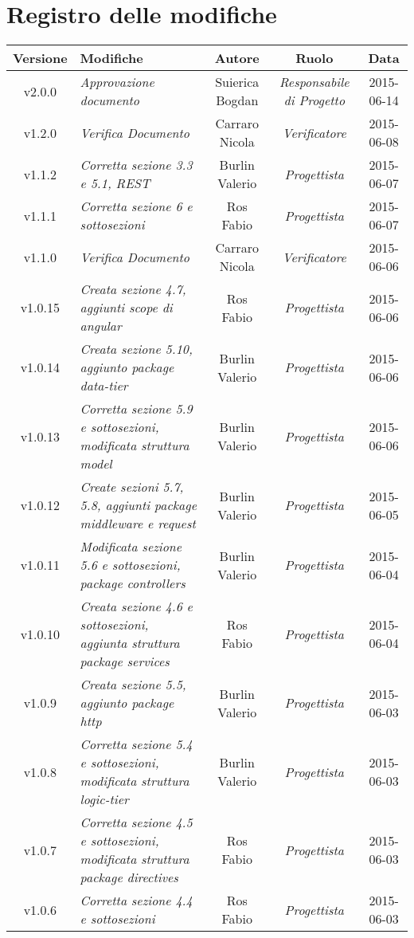 \section*{Registro delle modifiche}

\begin{table}[h]
\centering
\begin{tabular}{|c|p{}|c|c|c|}
	\toprule
	\textbf{Versione} & \textbf{Modifiche} & \textbf{Autore} & \textbf{Ruolo} & \textbf{Data} \\
	\midrule
		v2.0.0 & \textit{Approvazione documento} & Suierica Bogdan & \textit{Responsabile di Progetto} & 2015-06-14\\
	\midrule
		v1.2.0 & \textit{Verifica Documento} & Carraro Nicola & \textit{Verificatore} & 2015-06-08\\
	\midrule
		v1.1.2 & \textit{Corretta sezione 3.3 e 5.1, REST} & Burlin Valerio & \textit{Progettista} & 2015-06-07\\
	\midrule
		v1.1.1 & \textit{Corretta sezione 6 e sottosezioni} & Ros Fabio & \textit{Progettista} & 2015-06-07\\
	\midrule
		v1.1.0 & \textit{Verifica Documento} & Carraro Nicola & \textit{Verificatore} & 2015-06-06\\
	\midrule
		v1.0.15 & \textit{Creata sezione 4.7, aggiunti scope di angular} & Ros Fabio & \textit{Progettista} & 2015-06-06\\
	\midrule
		v1.0.14 & \textit{Creata sezione 5.10, aggiunto package data-tier} & Burlin Valerio & \textit{Progettista} & 2015-06-06\\
	\midrule
		v1.0.13 & \textit{Corretta sezione 5.9 e sottosezioni, modificata struttura model} & Burlin Valerio & \textit{Progettista} & 2015-06-06\\
	\midrule
		v1.0.12 & \textit{Create sezioni 5.7, 5.8, aggiunti package middleware e request} & Burlin Valerio & \textit{Progettista} & 2015-06-05\\
	\midrule
		v1.0.11 & \textit{Modificata sezione 5.6 e sottosezioni, package controllers} & Burlin Valerio & \textit{Progettista} & 2015-06-04\\
	\midrule
		v1.0.10 & \textit{Creata sezione 4.6 e sottosezioni, aggiunta struttura package services} & Ros Fabio & \textit{Progettista} & 2015-06-04\\
	\midrule
		v1.0.9 & \textit{Creata sezione 5.5, aggiunto package http} & Burlin Valerio & \textit{Progettista} & 2015-06-03\\
	\midrule
		v1.0.8 & \textit{Corretta sezione 5.4 e sottosezioni, modificata struttura logic-tier} & Burlin Valerio & \textit{Progettista} & 2015-06-03\\
	\midrule
		v1.0.7 & \textit{Corretta sezione 4.5 e sottosezioni, modificata struttura package directives} & Ros Fabio & \textit{Progettista} & 2015-06-03\\
	\midrule
		v1.0.6 & \textit{Corretta sezione 4.4 e sottosezioni} & Ros Fabio & \textit{Progettista} & 2015-06-03\\
	\bottomrule

\end{tabular}
\end{table}


